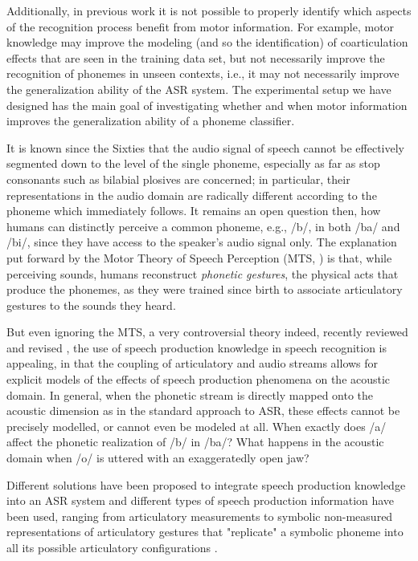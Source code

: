 \documentclass{pnastwo}
\begin{document}
\begin{article}
Additionally, in previous work it is not possible to properly identify which aspects of the
recognition process benefit from motor information. For example, motor knowledge may improve
the modeling (and so the identification) of coarticulation effects that are seen in the training
data set, but not necessarily improve the recognition of phonemes in unseen contexts, i.e., it
may not necessarily improve the generalization ability of the ASR system. The
experimental setup we have designed has the main goal of investigating whether and when motor information
improves the generalization ability of a phoneme classifier.

It is known since the Sixties \cite{liberman1} that the audio signal of speech
cannot be effectively segmented down to the level of the single phoneme,
especially as far as stop consonants such as bilabial plosives
are concerned; in particular, their representations in the audio domain are
radically different according to the phoneme which immediately follows.
It remains an open question then, how humans can distinctly perceive a common
phoneme, e.g., /b/, in both /ba/ and /bi/, since they have access to the speaker's
audio signal only. The explanation put forward by the Motor Theory of Speech Perception
(MTS, \cite{liberman2}) is that, while perceiving sounds, humans reconstruct
\emph{phonetic gestures}, the physical acts that produce the phonemes, as they were
trained since birth to associate articulatory gestures to the sounds they heard.

But even ignoring the MTS, a very controversial theory indeed, recently reviewed and
revised \cite{galant,massaro}, the use of speech production knowledge in speech recognition
is appealing, in that the coupling of articulatory and audio streams allows for explicit models
of the effects of speech production phenomena on the acoustic domain.
In general, when the phonetic stream is directly mapped onto the acoustic dimension as in the standard
approach to ASR, these effects cannot be precisely modelled, or cannot even be modeled at all.
When exactly does /a/ affect the phonetic realization of /b/ in /ba/?
What happens in the acoustic domain when /o/ is uttered with an exaggeratedly open jaw?

Different solutions have been proposed to integrate speech production knowledge into an ASR system
and different types of speech production information have been used, ranging from articulatory
measurements \cite{zlokarnik,stephenson,wrench} to symbolic non-measured representations of
articulatory gestures that "replicate" a symbolic phoneme into all its possible articulatory
configurations \cite{richardson, livescu}.   


\end{article}
\end{document}
